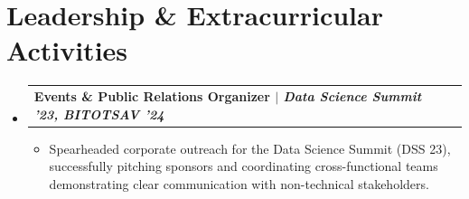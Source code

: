 \documentclass[a4paper,10pt]{article}
\makeatletter
\newcommand{\resumeItem}[1]{\item{\small{#1}}}
\newcommand{\resumeProjectHeading}[2]{\vspace{0.5mm}\item
    \begin{tabular*}{0.98\textwidth}[t]{l@{\extracolsep{\fill}}r}
      \textbf{#1} & \textit{\footnotesize{#2}}
    \end{tabular*}
}
\newcommand{\resumeSubHeadingListStart}{\begin{itemize}[leftmargin=*,labelsep=0mm]}
\newcommand{\resumeSubHeadingListEnd}{\end{itemize}\vspace{1mm}}
\newcommand{\resumeItemListStart}{\begin{itemize}[leftmargin=3ex, rightmargin=2ex, noitemsep,labelsep=1.2mm,itemsep=0mm]\small}
\newcommand{\resumeItemListEnd}{\end{itemize}\vspace{-2mm}}
\makeatother
\begin{document}
\section{Leadership \& Extracurricular Activities}
\resumeSubHeadingListStart
    \resumeProjectHeading
        {\textbf{Events \& Public Relations Organizer} $|$ \textit{Data Science Summit '23, BITOTSAV '24}}{}
    \resumeItemListStart
        \resumeItem{Spearheaded corporate outreach for the Data Science Summit (DSS 23), successfully pitching sponsors and coordinating cross-functional teams demonstrating clear communication with non-technical stakeholders.}
    \resumeItemListEnd
\resumeSubHeadingListEnd
\end{document}
